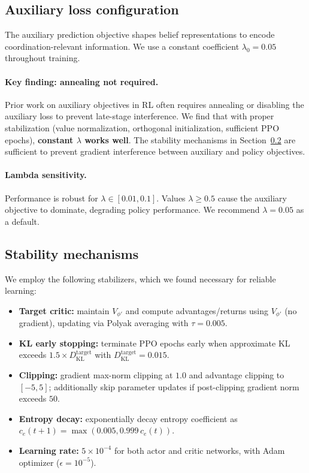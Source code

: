 \documentclass{article}
\theoremstyle{plain}
\theoremstyle{definition}
\theoremstyle{remark}
\begin{document}
\subsection{Auxiliary loss configuration}
The auxiliary prediction objective shapes belief representations to encode coordination-relevant information. We use a constant coefficient $\lambda_0 = 0.05$ throughout training.

\paragraph{Key finding: annealing not required.}
Prior work on auxiliary objectives in RL often requires annealing or disabling the auxiliary loss to prevent late-stage interference. We find that with proper stabilization (value normalization, orthogonal initialization, sufficient PPO epochs), \textbf{constant $\lambda$ works well}. The stability mechanisms in Section~\ref{sec:stability} are sufficient to prevent gradient interference between auxiliary and policy objectives.

\paragraph{Lambda sensitivity.}
Performance is robust for $\lambda \in [0.01, 0.1]$. Values $\lambda \geq 0.5$ cause the auxiliary objective to dominate, degrading policy performance. We recommend $\lambda = 0.05$ as a default.

\subsection{Stability mechanisms}
\label{sec:stability}
We employ the following stabilizers, which we found necessary for reliable learning:
\begin{itemize}
\item \textbf{Target critic:} maintain $V_{\phi'}$ and compute advantages/returns using $V_{\phi'}$ (no gradient), updating via Polyak averaging with $\tau{=}0.005$.
\item \textbf{KL early stopping:} terminate PPO epochs early when approximate KL exceeds $1.5\times D_{\mathrm{KL}}^{\mathrm{target}}$ with $D_{\mathrm{KL}}^{\mathrm{target}}{=}0.015$.
\item \textbf{Clipping:} gradient max-norm clipping at $1.0$ and advantage clipping to $[-5,5]$; additionally skip parameter updates if post-clipping gradient norm exceeds $50$.
\item \textbf{Entropy decay:} exponentially decay entropy coefficient as $c_e(t{+}1)=\max(0.005,0.999\,c_e(t))$.
\item \textbf{Learning rate:} $5\times10^{-4}$ for both actor and critic networks, with Adam optimizer ($\epsilon=10^{-5}$).
\end{itemize}
\end{document}
